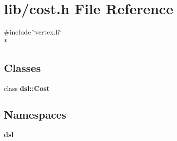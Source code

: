 \section{lib/cost.h File Reference}
\label{cost_8h}
{\ttfamily \#include \char`\"{}vertex.\-h\char`\"{}}\\*
\subsection*{Classes}
\begin{DoxyCompactItemize}
\item 
class {\bf dsl\-::\-Cost}
\end{DoxyCompactItemize}
\subsection*{Namespaces}
\begin{DoxyCompactItemize}
\item 
{\bf dsl}
\end{DoxyCompactItemize}

